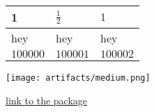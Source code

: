 \documentclass[12pt]{article}
\begin{document}
\begin{table}[]
\begin{tabular}{|l|l|l|}
\hline 
1 & $\frac 1 2$ & $1$\\ \hline 
hey & hey & hey\\ \hline 
$100000$ & $100001$ & $100002$\\ \hline 
\end{tabular}
\end{table}
\texttt{[image: artifacts/medium.png]}

\href{https://anaconda.org/NeKpoT/codetreegen}{\underline{link to the package}}
\end{document}
